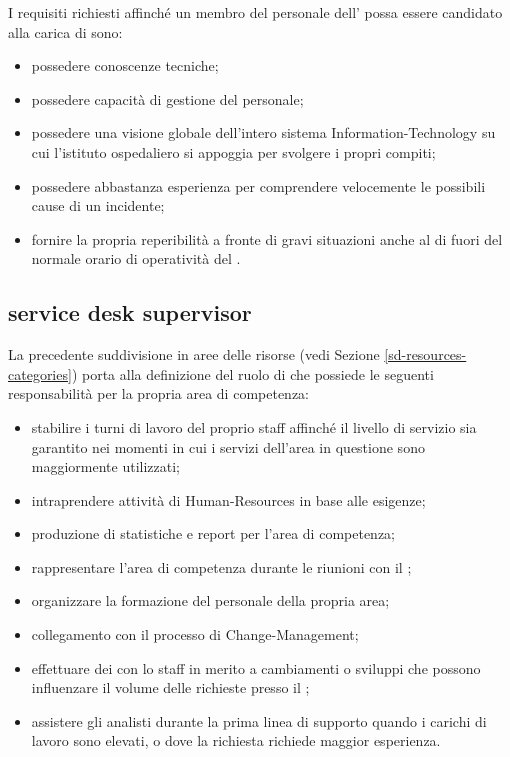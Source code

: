 I requisiti richiesti affinché un membro del personale dell'\entity{} possa essere candidato alla carica di  sono:

\begin{itemize}
\item{possedere conoscenze tecniche;}
\item{possedere capacità di gestione del personale;}
\item{possedere una visione globale dell'intero sistema \acs{Information-Technology} su cui l'istituto ospedaliero si appoggia per svolgere i propri compiti;}
\item{possedere abbastanza esperienza per comprendere velocemente le possibili cause di un incidente;}
\item{fornire la propria reperibilità a fronte di gravi situazioni anche al di fuori del normale orario di operatività del .}
\end{itemize}

\subsection[Service Desk Supervisor]{service desk supervisor}
\label{sd-sd-supervisor}
La precedente suddivisione in aree delle risorse (vedi Sezione \ref{sd-resources-categories}) porta alla definizione del ruolo di  che possiede le seguenti responsabilità per la propria area di competenza:

\begin{itemize}
\item{stabilire i turni di lavoro del proprio staff affinché il livello di servizio sia garantito nei momenti in cui i servizi dell'area in questione sono maggiormente utilizzati;}
\item{intraprendere attività di \ac{Human-Resources} in base alle esigenze;}
\item{produzione di statistiche e report per l'area di competenza;}
\item{rappresentare l'area di competenza durante le riunioni con il ;}
\item{organizzare la formazione del personale della propria area;}
\item{collegamento con il processo di \ac{Change-Management};}
\item{effettuare dei  con lo staff in merito a cambiamenti o sviluppi che possono influenzare il volume delle richieste presso il ;}
\item{assistere gli analisti durante la prima linea di supporto quando i carichi di lavoro sono elevati, o dove la richiesta richiede maggior esperienza.}
\end{itemize}

